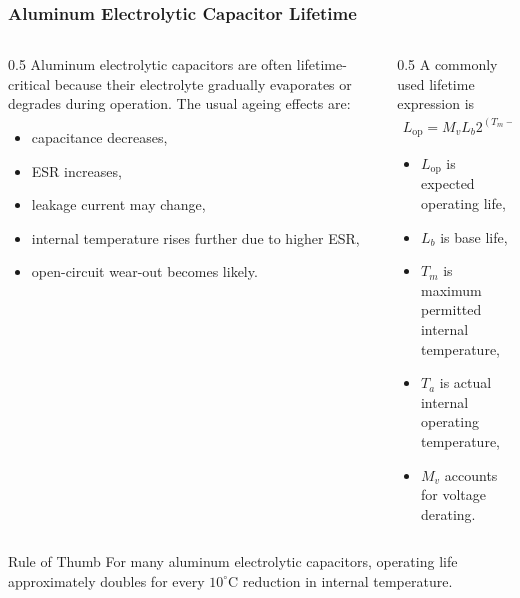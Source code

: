 \begin{frame}
\frametitle{Aluminum Electrolytic Capacitor Lifetime}
\begin{columns}
\begin{column}{0.5\textwidth}
Aluminum electrolytic capacitors are often lifetime-critical because their electrolyte gradually evaporates or degrades during operation. The usual ageing effects are:
\begin{itemize}
    \item capacitance decreases,
    \item ESR increases,
    \item leakage current may change,
    \item internal temperature rises further due to higher ESR,
    \item open-circuit wear-out becomes likely.
\end{itemize}
\end{column}

\begin{column}{0.5\textwidth}
A commonly used lifetime expression is
\begin{align}
    L_{\mathrm{op}}
    =
    M_v L_b
    2^{(T_m-T_a)/10}
\end{align}
\begin{itemize}
    \item \(L_{\mathrm{op}}\) is expected operating life,
    \item \(L_b\) is base life,
    \item \(T_m\) is maximum permitted internal temperature,
    \item \(T_a\) is actual internal operating temperature,
    \item \(M_v\) accounts for voltage derating.
\end{itemize}
\end{column}
\end{columns}
\begin{block}{Rule of Thumb}
\small
For many aluminum electrolytic capacitors, operating life approximately doubles for every \(10^\circ\mathrm{C}\) reduction in internal temperature.
\end{block}
\end{frame}


